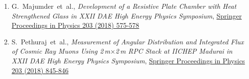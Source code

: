 \documentclass[12pt]{article}
\begin{document}
\begin{justify}
\begin{enumerate}[b.]
\begin{enumerate}[1.]
  \item G.~Majumder~et~al., \emph{Development of a Resistive Plate Chamber with Heat Strengthened Glass in XXII DAE High Energy Physics Symposium}, \href{https://doi.org/10.1007/978-3-319-73171-1_135}{Springer Proceedings in Physics 203 (2018) 575-578}
  \item S.~Pethuraj~et~al., \emph{Measurement of Angular Distribution and Integrated Flux of Cosmic Ray Muons Using 2\,m$\times$2\,m RPC Stack at IICHEP Madurai in XXII DAE High Energy Physics Symposium}, \href{https://doi.org/10.1007/978-3-319-73171-1_205}{Springer Proceedings in Physics 203 (2018) 845-846}
  \end{enumerate}
\end{enumerate}
\end{justify}

\newpage
\end{document}
